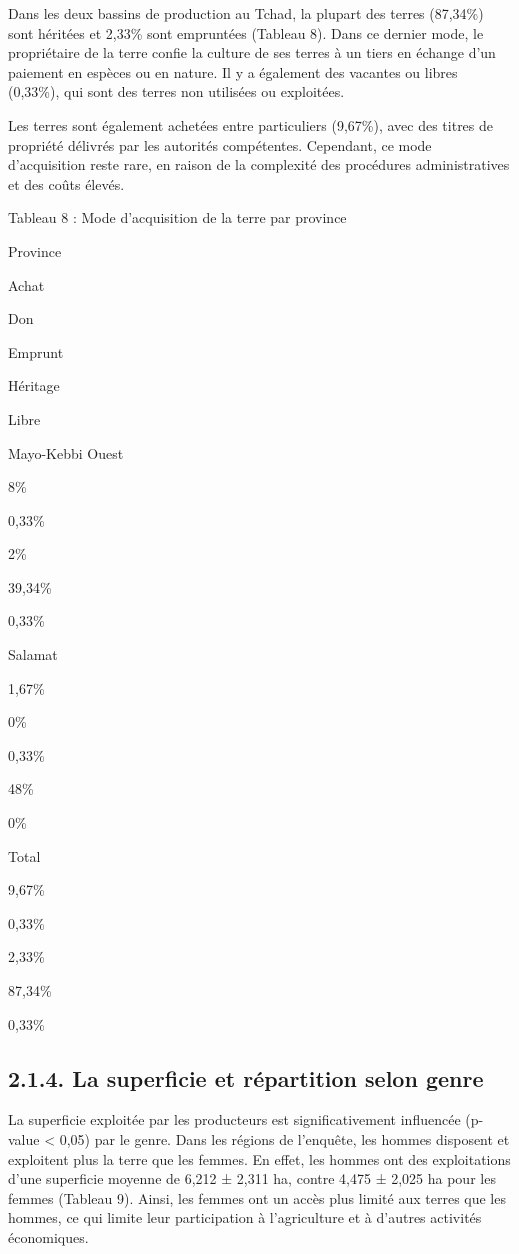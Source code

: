 \documentclass[12pt,oneside]{report}
\begin{document}
Dans les deux bassins de production au Tchad, la plupart des terres (87,34\%) sont héritées et 2,33\% sont empruntées (Tableau 8). Dans ce dernier mode, le propriétaire de la terre confie la culture de ses terres à un tiers en échange d'un paiement en espèces ou en nature. Il y a également des vacantes ou libres (0,33\%), qui sont des terres non utilisées ou exploitées.

Les terres sont également achetées entre particuliers (9,67\%), avec des titres de propriété délivrés par les autorités compétentes. Cependant, ce mode d'acquisition reste rare, en raison de la complexité des procédures administratives et des coûts élevés.

Tableau 8 : Mode d’acquisition de la terre par province

Province

Achat

Don

Emprunt

Héritage

Libre

Mayo-Kebbi Ouest

8\%

0,33\%

2\%

39,34\%

0,33\%

Salamat

1,67\%

0\%

0,33\%

48\%

0\%

Total

9,67\%

0,33\%

2,33\%

87,34\%

0,33\%

\subsection{2.1.4. La superficie et répartition selon genre}
La superficie exploitée par les producteurs est significativement influencée (p-value < 0,05) par le genre. Dans les régions de l’enquête, les hommes disposent et exploitent plus la terre que les femmes. En effet, les hommes ont des exploitations d’une superficie moyenne de 6,212 ± 2,311 ha, contre 4,475 ± 2,025 ha pour les femmes (Tableau 9). Ainsi, les femmes ont un accès plus limité aux terres que les hommes, ce qui limite leur participation à l'agriculture et à d'autres activités économiques.
\end{document}
